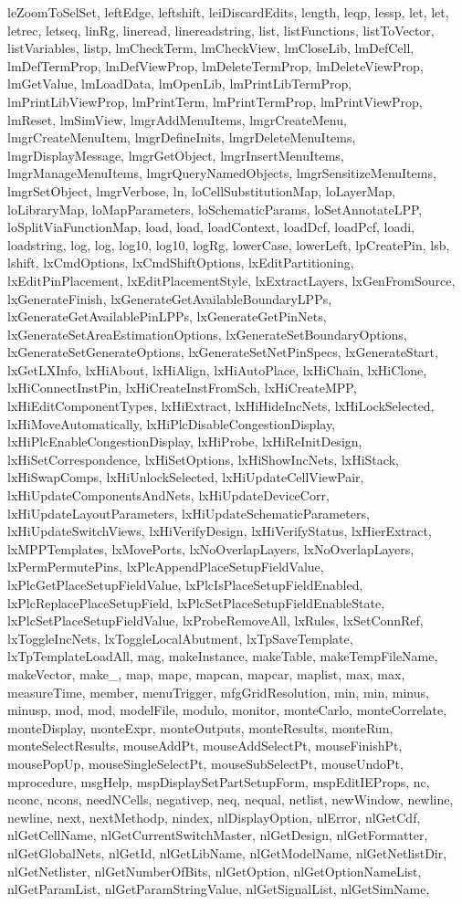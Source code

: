 {{leZoomToSelSet, leftEdge, leftshift, leiDiscardEdits, length, leqp, lessp, let, let, letrec, letseq, linRg, lineread, linereadstring, list, listFunctions, listToVector, listVariables, listp, lmCheckTerm, lmCheckView, lmCloseLib, lmDefCell, lmDefTermProp, lmDefViewProp, lmDeleteTermProp, lmDeleteViewProp, lmGetValue, lmLoadData, lmOpenLib, lmPrintLibTermProp, lmPrintLibViewProp, lmPrintTerm, lmPrintTermProp, lmPrintViewProp, lmReset, lmSimView, lmgrAddMenuItems, lmgrCreateMenu, lmgrCreateMenuItem, lmgrDefineInits, lmgrDeleteMenuItems, lmgrDisplayMessage, lmgrGetObject, lmgrInsertMenuItems, lmgrManageMenuItems, lmgrQueryNamedObjects, lmgrSensitizeMenuItems, lmgrSetObject, lmgrVerbose, ln, loCellSubstitutionMap, loLayerMap, loLibraryMap, loMapParameters, loSchematicParams, loSetAnnotateLPP, loSplitViaFunctionMap, load, load, loadContext, loadDcf, loadPcf, loadi, loadstring, log, log, log10, log10, logRg, lowerCase, lowerLeft, lpCreatePin, lsb, lshift, lxCmdOptions, lxCmdShiftOptions, lxEditPartitioning, lxEditPinPlacement, lxEditPlacementStyle, lxExtractLayers, lxGenFromSource, lxGenerateFinish, lxGenerateGetAvailableBoundaryLPPs, lxGenerateGetAvailablePinLPPs, lxGenerateGetPinNets, lxGenerateSetAreaEstimationOptions, lxGenerateSetBoundaryOptions, lxGenerateSetGenerateOptions, lxGenerateSetNetPinSpecs, lxGenerateStart, lxGetLXInfo, lxHiAbout, lxHiAlign, lxHiAutoPlace, lxHiChain, lxHiClone, lxHiConnectInstPin, lxHiCreateInstFromSch, lxHiCreateMPP, lxHiEditComponentTypes, lxHiExtract, lxHiHideIncNets, lxHiLockSelected, lxHiMoveAutomatically, lxHiPlcDisableCongestionDisplay, lxHiPlcEnableCongestionDisplay, lxHiProbe, lxHiReInitDesign, lxHiSetCorrespondence, lxHiSetOptions, lxHiShowIncNets, lxHiStack, lxHiSwapComps, lxHiUnlockSelected, lxHiUpdateCellViewPair, lxHiUpdateComponentsAndNets, lxHiUpdateDeviceCorr, lxHiUpdateLayoutParameters, lxHiUpdateSchematicParameters, lxHiUpdateSwitchViews, lxHiVerifyDesign, lxHiVerifyStatus, lxHierExtract, lxMPPTemplates, lxMovePorts, lxNoOverlapLayers, lxNoOverlapLayers, lxPermPermutePins, lxPlcAppendPlaceSetupFieldValue, lxPlcGetPlaceSetupFieldValue, lxPlcIsPlaceSetupFieldEnabled, lxPlcReplacePlaceSetupField, lxPlcSetPlaceSetupFieldEnableState, lxPlcSetPlaceSetupFieldValue, lxProbeRemoveAll, lxRules, lxSetConnRef, lxToggleIncNets, lxToggleLocalAbutment, lxTpSaveTemplate, lxTpTemplateLoadAll, mag, makeInstance, makeTable, makeTempFileName, makeVector, make_, map, mapc, mapcan, mapcar, maplist, max, max, measureTime, member, menuTrigger, mfgGridResolution, min, min, minus, minusp, mod, mod, modelFile, modulo, monitor, monteCarlo, monteCorrelate, monteDisplay, monteExpr, monteOutputs, monteResults, monteRun, monteSelectResults, mouseAddPt, mouseAddSelectPt, mouseFinishPt, mousePopUp, mouseSingleSelectPt, mouseSubSelectPt, mouseUndoPt, mprocedure, msgHelp, mspDisplaySetPartSetupForm, mspEditIEProps, nc, nconc, ncons, needNCells, negativep, neq, nequal, netlist, newWindow, newline, newline, next, nextMethodp, nindex, nlDisplayOption, nlError, nlGetCdf, nlGetCellName, nlGetCurrentSwitchMaster, nlGetDesign, nlGetFormatter, nlGetGlobalNets, nlGetId, nlGetLibName, nlGetModelName, nlGetNetlistDir, nlGetNetlister, nlGetNumberOfBits, nlGetOption, nlGetOptionNameList, nlGetParamList, nlGetParamStringValue, nlGetSignalList, nlGetSimName, }}

